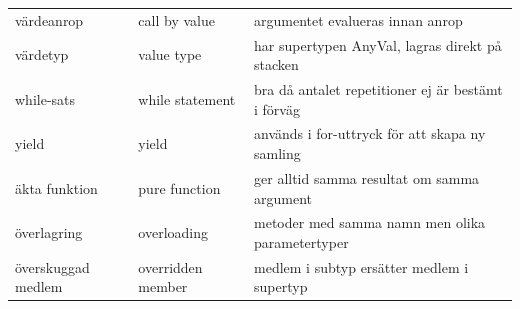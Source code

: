 \begin{tabular}{l|l|l}
värdeanrop & call by value & argumentet evalueras innan anrop \\
värdetyp & value type & har supertypen AnyVal, lagras direkt på stacken \\
while-sats & while statement & bra då antalet repetitioner ej är bestämt i förväg \\
yield & yield & används i for-uttryck för att skapa ny samling \\
äkta funktion & pure function & ger alltid samma resultat om samma argument \\
överlagring & overloading & metoder med samma namn men olika parametertyper \\
överskuggad medlem & overridden member & medlem i subtyp ersätter medlem i supertyp \\
\end{tabular}
